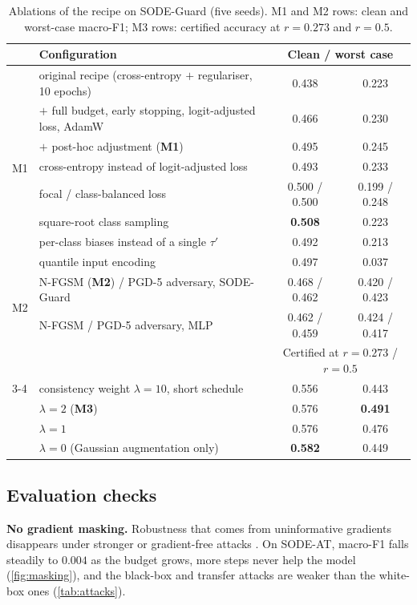 \documentclass{article}
\theoremstyle{definition}
\begin{document}
\begin{table}[t]
\caption{Ablations of the recipe on SODE-Guard (five seeds). M1 and M2 rows:
clean and worst-case macro-F1; M3 rows: certified accuracy at $r=0.273$ and
$r=0.5$.}
\label{tab:ablation}
\centering\footnotesize
\setlength{\tabcolsep}{5pt}
\begin{tabular}{llcc}
\toprule
& Configuration & \multicolumn{2}{c}{Clean / worst case}\\
\midrule
\multirow{8}{*}{M1}
& original recipe (cross-entropy $+$ regulariser, 10 epochs) & 0.438 & 0.223\\
& $+$ full budget, early stopping, logit-adjusted loss, AdamW & 0.466 & 0.230\\
& $+$ post-hoc adjustment (\textbf{M1}) & 0.495 & 0.245\\
& \quad cross-entropy instead of logit-adjusted loss & 0.493 & 0.233\\
& \quad focal / class-balanced loss & 0.500 / 0.500 & 0.199 / 0.248\\
& \quad square-root class sampling & \textbf{0.508} & 0.223\\
& \quad per-class biases instead of a single $\tau'$ & 0.492 & 0.213\\
& \quad quantile input encoding & 0.497 & 0.037\\
\midrule
\multirow{2}{*}{M2}
& N-FGSM (\textbf{M2}) / PGD-5 adversary, SODE-Guard & 0.468 / 0.462 & 0.420 / 0.423\\
& N-FGSM / PGD-5 adversary, MLP & 0.462 / 0.459 & 0.424 / 0.417\\
\midrule
& & \multicolumn{2}{c}{Certified at $r=0.273$ / $r=0.5$}\\
\cmidrule(lr){3-4}
\multirow{4}{*}{M3}
& consistency weight $\lambda=10$, short schedule & 0.556 & 0.443\\
& $\lambda=2$ (\textbf{M3}) & 0.576 & \textbf{0.491}\\
& $\lambda=1$ & 0.576 & 0.476\\
& $\lambda=0$ (Gaussian augmentation only) & \textbf{0.582} & 0.449\\
\bottomrule
\end{tabular}
\end{table}

\subsection{Evaluation checks}
\textbf{No gradient masking.} Robustness that comes from uninformative gradients
disappears under stronger or gradient-free attacks
\citep{athalye2018obfuscated,carlini2019evaluating}. On SODE-AT, macro-F1 falls
steadily to $0.004$ as the budget grows, more steps never help the model
(\cref{fig:masking}), and the black-box and transfer attacks are weaker than
the white-box ones (\cref{tab:attacks}).
\end{document}
